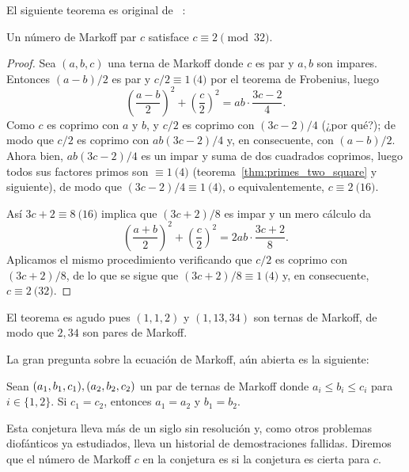 \documentclass[teoria-numeros.tex]{subfiles}
\begin{document}
El siguiente teorema es original de \citeauthor{zhang2007markoff}~\cite{zhang2007markoff}:
\begin{thm}[Y.~Zhang]
	Un número de Markoff par $c$ satisface $c \equiv 2 \pmod{32}$.
\end{thm}
\begin{proof}
	Sea $(a, b, c)$ una terna de Markoff donde $c$ es par y $a, b$ son impares.
	Entonces $(a - b)/2$ es par y $c/2 \equiv 1 \pod 4$ por el teorema de Frobenius, luego
	$$ \left( \frac{a - b}{2} \right)^2 + \left( \frac{c}{2} \right)^2 = ab\cdot \frac{3c - 2}{4}. $$
	Como $c$ es coprimo con $a$ y $b$, y $c/2$ es coprimo con $(3c - 2)/4$ (¿por qué?);
	de modo que $c/2$ es coprimo con $ab(3c - 2)/4$ y, en consecuente, con $(a - b)/2$.
	Ahora bien, $ab(3c - 2)/4$ es un impar y suma de dos cuadrados coprimos, luego todos sus factores primos son $\equiv 1 \pod 4$
	(teorema~\ref{thm:primes_two_square} y siguiente), de modo que $(3c - 2)/4 \equiv 1 \pod 4$, o equivalentemente, $c \equiv 2 \pod{16}$.

	Así $3c + 2 \equiv 8 \pod{16}$ implica que $(3c + 2)/8$ es impar y un mero cálculo da
	$$ \left( \frac{a + b}{2} \right)^2 + \left( \frac{c}{2} \right)^2 = 2ab\cdot \frac{3c + 2}{8}. $$
	Aplicamos el mismo procedimiento verificando que $c/2$ es coprimo con $(3c + 2)/8$, de lo que se sigue que $(3c + 2)/8 \equiv 1 \pod 4$ y,
	en consecuente, $c \equiv 2 \pod{32}$.
\end{proof}
El teorema es agudo pues $(1, 1, 2)$ y $(1, 13, 34)$ son ternas de Markoff, de modo que $2, 34$ son pares de Markoff.

La gran pregunta sobre la ecuación de Markoff, aún abierta es la siguiente:
\begin{con}
	Sean $(a_1, b_1, c_1), (a_2, b_2, \break c_2)$ un par de ternas de Markoff donde $a_i \le b_i \le c_i$ para $i \in \{ 1, 2 \}$.
	Si $c_1 = c_2$, entonces $a_1 = a_2$ y $b_1 = b_2$.
\end{con}
Esta conjetura lleva más de un siglo sin resolución y, como otros problemas diofánticos ya estudiados, lleva un historial de demostraciones fallidas.
Diremos que el número de Markoff $c$ en la conjetura es  si la conjetura es cierta para $c$.
\end{document}
